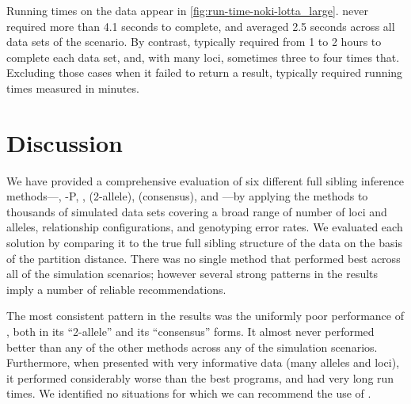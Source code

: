 Running times on the \lottalarge{} data appear in \ref{fig:run-time-noki-lotta_large}.  \familyfinder{} 
never required more than 4.1 seconds to complete, and averaged 2.5 seconds across all data sets of the 
\lottalarge{} scenario.  By contrast, \colony{} typically required from 1 to 2 hours to complete each 
data set, and, with many loci, sometimes three to four times that. Excluding those cases when it failed 
to return a result, \prt{} typically required running times measured in minutes.

\section*{Discussion}
We have provided a comprehensive evaluation of six different full sibling inference
methods---\colony{}, \colony-P, \familyfinder{}, \kinalyzer{} (2-allele), \kinalyzer{} (consensus), 
and \prt{}---by applying the methods to thousands of simulated data sets covering a broad range of number of loci 
and alleles, relationship configurations, and genotyping error rates.  We evaluated each solution by 
comparing it to the true full sibling structure of the data on the basis of the partition distance.  
There was no single method that performed best across all of the simulation scenarios; however several 
strong patterns in the results imply a number of reliable recommendations.

The most consistent pattern in the results was the uniformly poor performance of \kinalyzer{}, both in 
its ``2-allele'' and its ``consensus'' forms.  It almost never performed better than any of the other 
methods across any of the simulation scenarios.  Furthermore, when presented with very informative data 
(many alleles and loci), it performed considerably worse than the best programs, and had very long run 
times.  We identified no situations for which we can recommend the use of \kinalyzer{}.


